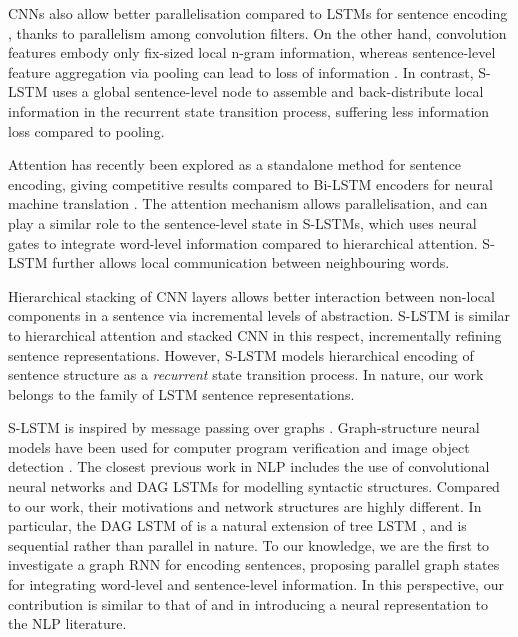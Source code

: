 \documentclass[11pt,a4paper]{article}
\begin{document}
CNNs \cite{krizhevsky2012imagenet} also allow better parallelisation compared to LSTMs for sentence encoding \cite{kim2014convolutional}, thanks to parallelism among convolution filters. 
On the other hand, convolution features embody only fix-sized local n-gram information, whereas sentence-level feature aggregation via pooling can lead to loss of information \cite{sabour2017dynamic}.
In contrast, S-LSTM uses a global sentence-level node to assemble and back-distribute local information in the recurrent state transition process, suffering less information loss compared to pooling.


Attention \cite{bahdanau2014neural} has recently been explored as a standalone method for sentence encoding, giving competitive results compared to Bi-LSTM encoders for neural machine translation \cite{vaswani2017attention}. 
The attention mechanism allows parallelisation, and can play a similar role to the sentence-level state in S-LSTMs, which uses neural gates to integrate word-level information compared to hierarchical attention.
S-LSTM further allows local communication between neighbouring words.


Hierarchical stacking of CNN layers \cite{lecun1995convolutional,kalchbrenner2014convolutional,papandreou2015weakly,dauphin2016language} allows better interaction between non-local components in a sentence via incremental levels of abstraction.
S-LSTM is similar to hierarchical attention and stacked CNN in this respect, incrementally refining sentence representations.
However, S-LSTM models hierarchical encoding of sentence structure as a \emph{recurrent} state transition process.
In nature, our work belongs to the family of LSTM sentence representations.


S-LSTM is inspired by message passing over graphs \cite{murphy1999loopy,scarselli2009graph}.
Graph-structure neural models have been used for computer program verification \cite{li2015gated} and image object detection \cite{liang2016semantic}. 
The closest previous work in NLP includes the use of convolutional neural networks \cite{bastings-EtAl:2017:EMNLP2017,marcheggiani-titov:2017:EMNLP2017} and DAG LSTMs \cite{TACL1028} for modelling syntactic structures.
Compared to our work, their motivations and network structures are highly different.
In particular, the DAG LSTM of  is a natural extension of tree LSTM \cite{tai-socher-manning:2015:ACL-IJCNLP}, and is sequential rather than parallel in nature.
To our knowledge, we are the first to investigate a graph RNN for encoding sentences, proposing parallel graph states for integrating word-level and sentence-level information.
In this perspective, our contribution is similar to that of  and  in introducing a neural representation to the NLP literature. 
\end{document}
